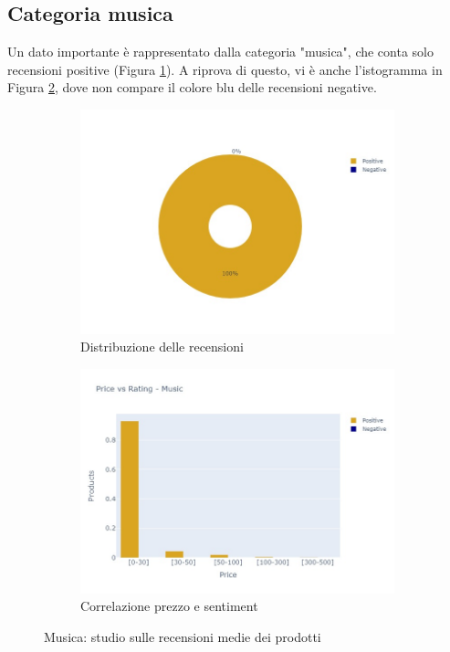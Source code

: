 			
			\subsection{Categoria musica}
				Un dato importante è rappresentato dalla categoria "musica", che conta solo recensioni positive (Figura \ref{fig:pie_music}). A riprova di questo, vi è anche l'istogramma in Figura \ref{fig:priceVSrating_music}, dove non compare il colore blu delle recensioni negative. 
					
				\begin{figure} [h]
					\centering
					\begin{subfigure}{0.48\textwidth}
						\includegraphics[width=\textwidth]{Figure/pie_music}
						\caption{Distribuzione delle recensioni}
						\label{fig:pie_music}
					\end{subfigure}
					\begin{subfigure}{0.48\textwidth}
						\includegraphics[width=\textwidth]{Figure/priceVSrating_music}
						\caption{Correlazione prezzo e sentiment}
						\label{fig:priceVSrating_music}
					\end{subfigure}
					\caption{Musica: studio sulle recensioni medie dei prodotti}\label{fig:price_raiting_music}
				\end{figure}
			
